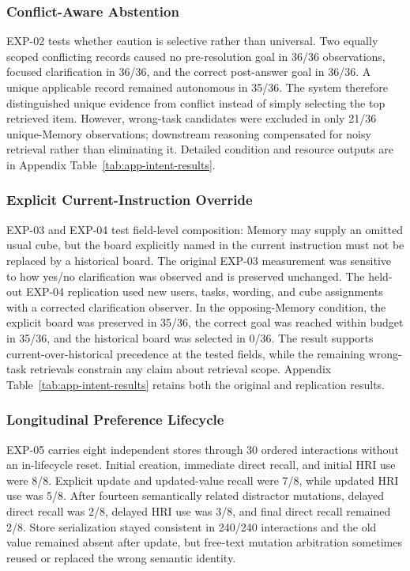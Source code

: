 \documentclass{article}
\begin{document}
\subsubsection{Conflict-Aware Abstention}

EXP-02 tests whether caution is selective rather than universal. Two equally
scoped conflicting records caused no pre-resolution goal in 36/36 observations,
focused clarification in 36/36, and the correct post-answer goal in 36/36. A
unique applicable record remained autonomous in 35/36. The system therefore
distinguished unique evidence from conflict instead of simply selecting the
top retrieved item. However, wrong-task candidates were excluded in only 21/36
unique-Memory observations; downstream reasoning compensated for noisy
retrieval rather than eliminating it. Detailed condition and resource outputs
are in Appendix Table~\ref{tab:app-intent-results}.

\subsubsection{Explicit Current-Instruction Override}

EXP-03 and EXP-04 test field-level composition: Memory may supply an omitted
usual cube, but the board explicitly named in the current instruction must not
be replaced by a historical board. The original EXP-03 measurement was
sensitive to how yes/no clarification was observed and is preserved unchanged.
The held-out EXP-04 replication used new users, tasks, wording, and cube
assignments with a corrected clarification observer. In the opposing-Memory
condition, the explicit board was preserved in 35/36, the correct goal was
reached within budget in 35/36, and the historical board was selected in 0/36.
The result supports current-over-historical precedence at the tested fields,
while the remaining wrong-task retrievals constrain any claim about retrieval
scope. Appendix Table~\ref{tab:app-intent-results} retains both the original and
replication results.

\subsubsection{Longitudinal Preference Lifecycle}

EXP-05 carries eight independent stores through 30 ordered interactions without
an in-lifecycle reset. Initial creation, immediate direct recall, and initial
HRI use were 8/8. Explicit update and updated-value recall were 7/8, while
updated HRI use was 5/8. After fourteen semantically related distractor
mutations, delayed direct recall was 2/8, delayed HRI use was 3/8, and final
direct recall remained 2/8. Store serialization stayed consistent in 240/240
interactions and the old value remained absent after update, but free-text
mutation arbitration sometimes reused or replaced the wrong semantic identity.
\end{document}
